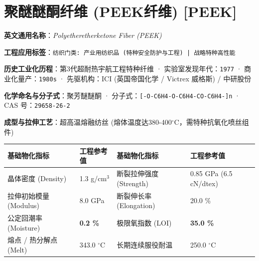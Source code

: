 \documentclass[11pt,openright,twoside,UTF8]{ctexbook}
\begin{document}
\section{聚醚醚酮纤维 (PEEK纤维) [PEEK]}
\label{sec:peek}

\noindent\textbf{英文通用名称}：\textit{Polyetheretherketone Fiber (PEEK)}\par
\noindent\textbf{工程应用标签}：\texttt{纺织门类: 产业用纺织品 (特种安全防护与工程) | 战略特种高性能}\par
\noindent\textbf{历史工业化历程}：第3代超耐热宇航工程特种纤维 · 实验室发现年代：\texttt{1977} · 商业化量产：\texttt{1980s} · 先驱机构：ICI (英国帝国化学 / Victrex 威格斯) / 中研股份\par
\noindent\textbf{化学命名与分子式}：聚芳醚醚酮 · 分子式：\texttt{[-O-C6H4-O-C6H4-CO-C6H4-]n} · CAS 号：\texttt{29658-26-2}\par
\noindent\textbf{成型与拉伸工艺}：超高温熔融纺丝 (熔体温度达380-400$^\circ\mathrm{C}$，需特种抗氧化喷丝组件)\par

\vspace{0.15cm}
\begin{center}
\small
\begin{tabularx}{\textwidth}{p{3.8cm}Xp{3.8cm}X}
\toprule
\textbf{基础物化指标} & \textbf{工程参考值} & \textbf{基础物化指标} & \textbf{工程参考值} \\
\midrule
晶体密度 (Density) & 1.3 g/cm$^3$ & 断裂拉伸强度 (Strength) & 0.85 GPa (6.5 cN/dtex) \\
拉伸初始模量 (Modulus) & 8.0 GPa & 断裂伸长率 (Elongation) & 20.0 \% \\
公定回潮率 (Moisture) & \textbf{0.2 \%} & 极限氧指数 (LOI) & \textbf{35.0 \%} \\
熔点 / 热分解点 (Melt) & 343.0 $^\circ\mathrm{C}$ & 长期连续服役耐温 & 250.0 $^\circ\mathrm{C}$ \\
\bottomrule
\end{tabularx}
\end{center}
\vspace{0.15cm}
\end{document}
